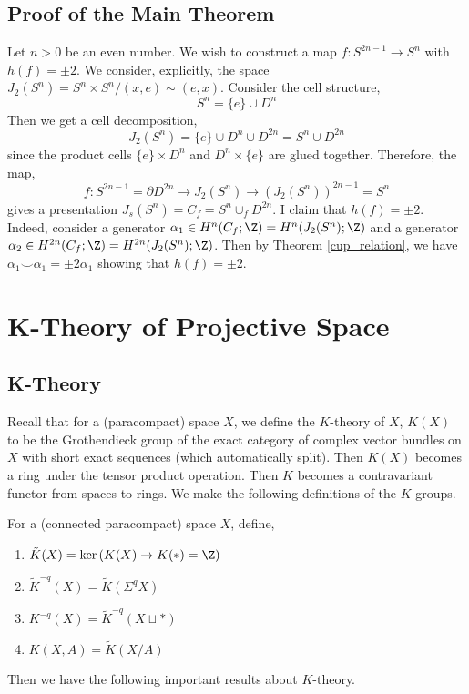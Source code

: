 \documentclass[12pt]{extarticle}
\begin{document}
\subsection{Proof of the Main Theorem}

Let $n > 0$ be an even number. We wish to construct a map $f : S^{2n - 1} \to S^n$ with $h(f) = \pm 2$. We consider, explicitly, the space $J_2(S^n) = S^n \times S^n / (x, e) \sim (e, x)$. Consider the cell structure,
\[ S^n = \{ e \} \cup D^n \] 
Then we get a cell decomposition,
\[ J_2(S^n) = \{ e \} \cup D^n \cup D^{2n} = S^n \cup D^{2n} \]
since the product cells $\{ e \} \times D^n$ and $D^n \times \{ e \}$ are glued together. Therefore, the map,
\[ f : S^{2n - 1} = \partial D^{2n} \to J_2(S^n) \to (J_2(S^n))^{2n - 1} = S^n \]
gives a presentation $J_s(S^n) = C_f = S^n \cup_f D^{2n}$. I claim that $h(f) = \pm 2$. Indeed, consider a generator $\alpha_1 \in H^n(C_f; \Z) = H^n(J_2(S^n); \Z)$ and a generator $\alpha_2 \in H^{2n}(C_f; \Z) = H^{2n}(J_2(S^n); \Z)$. Then by Theorem \ref{cup_relation}, we have $\alpha_1 \smile \alpha_1 = \pm 2 \alpha_1$ showing that $h(f) = \pm 2$. 

\section{K-Theory of Projective Space}

\subsection{K-Theory}

Recall that for a (paracompact) space $X$, we define the $K$-theory of $X$, $K(X)$ to be the Grothendieck group of the exact category of complex vector bundles on $X$ with short exact sequences (which automatically split). Then $K(X)$ becomes a ring under the tensor product operation. Then $K$ becomes a contravariant functor from spaces to rings. We make the following definitions of the $K$-groups.

\begin{defn}
For a (connected paracompact) space $X$, define,
\begin{enumerate}
\item $\tilde{K}(X) = \ker{(K(X) \to K(*) = \Z)}$ 
\item $\tilde{K}^{-q}(X) = \tilde{K}(\Sigma^q X)$
\item $K^{-q}(X) = \tilde{K}^{-q}(X \sqcup *)$
\item $K(X, A) = \tilde{K}(X/A)$
\end{enumerate}
\end{defn}
\noindent
Then we have the following important results about $K$-theory.
\end{document}
